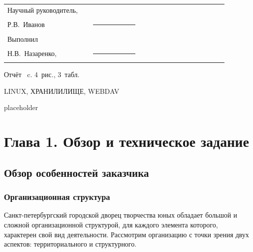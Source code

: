 \documentclass[utf8,usehyperref,12pt]{G7-32}
\begin{document}

\frontmatter %



\Executors %
\begin{longtable}{p{0.35\linewidth}p{0.2\linewidth}p{0.35\linewidth}}
Научный руководитель, 	&		&	\\
Р.В.~Иванов	&\rule{1\linewidth}{0.1pt}	&  \\ \vspace{1cm}

Выполнил  &		&	\\
Н.В.~Назаренко, & \rule{1\linewidth}{0.1pt}& \\
\end{longtable}

\Referat %
Отчёт \pageref{LastPage}~c. 4~рис., 3~табл.

\MakeUppercase{Linux, хранилилище, webdav}



\tableofcontents




\Introduction

placeholder

\mainmatter %

\chapter{Глава 1. Обзор и техническое задание}

\section{Обзор особенностей заказчика}
\subsection{Организационная структура}
Санкт-петербургский городской дворец творчества юных обладает большой и сложной организационной структурой, для каждого 
элемента которого, характерен свой вид деятельности. Рассмотрим организацию с точки зрения двух аспектов: территориального
и структурного.
\end{document}
